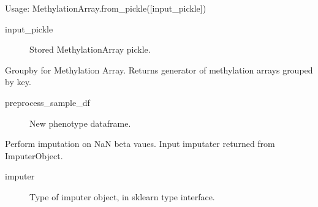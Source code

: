 \documentclass[letterpaper,10pt,english]{sphinxmanual}
\begin{document}
\begin{fulllineitems}
\begin{fulllineitems}
Usage: MethylationArray.from\_pickle({[}input\_pickle{]})
\begin{description}
\item[{input\_pickle}] \leavevmode
Stored MethylationArray pickle.

\end{description}

\end{fulllineitems}


\begin{fulllineitems}
\label{\detokenize{index:pymethylprocess.MethylationDataTypes.MethylationArray.groupby}}
Groupby for Methylation Array. Returns generator of methylation arrays grouped by key.
\begin{description}
\item[{preprocess\_sample\_df}] \leavevmode
New phenotype dataframe.

\end{description}

\end{fulllineitems}


\begin{fulllineitems}
\label{\detokenize{index:pymethylprocess.MethylationDataTypes.MethylationArray.impute}}
Perform imputation on NaN beta vaues. Input imputater returned from ImputerObject.
\begin{description}
\item[{imputer}] \leavevmode
Type of imputer object, in sklearn type interface.

\end{description}

\end{fulllineitems}



\end{fulllineitems}
\end{document}
